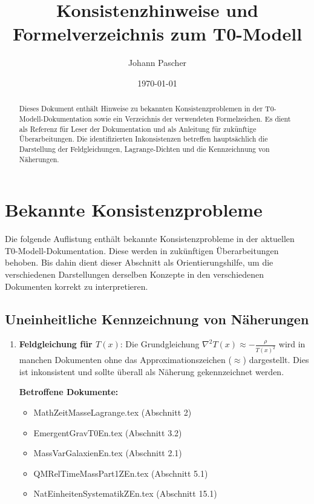 \documentclass[12pt,a4paper]{article}
\title{Konsistenzhinweise und Formelverzeichnis zum T0-Modell}
\author{Johann Pascher}
\date{\today}
\newcommand{\Tfield}{T(x)}
\begin{document}
	
	\maketitle
	
	\begin{abstract}
		Dieses Dokument enthält Hinweise zu bekannten Konsistenzproblemen in der T0-Modell-Dokumentation sowie ein Verzeichnis der verwendeten Formelzeichen. Es dient als Referenz für Leser der Dokumentation und als Anleitung für zukünftige Überarbeitungen. Die identifizierten Inkonsistenzen betreffen hauptsächlich die Darstellung der Feldgleichungen, Lagrange-Dichten und die Kennzeichnung von Näherungen.
	\end{abstract}
	
	\tableofcontents
	\newpage
	
	\section{Bekannte Konsistenzprobleme}
	
	\begin{tcolorbox}[colback=yellow!5!white,colframe=yellow!75!black,title=Hinweis für Leser]
		Die folgende Auflistung enthält bekannte Konsistenzprobleme in der aktuellen T0-Modell-Dokumentation. Diese werden in zukünftigen Überarbeitungen behoben. Bis dahin dient dieser Abschnitt als Orientierungshilfe, um die verschiedenen Darstellungen derselben Konzepte in den verschiedenen Dokumenten korrekt zu interpretieren.
	\end{tcolorbox}
	
	\subsection{Uneinheitliche Kennzeichnung von Näherungen}
	
	\begin{enumerate}[label=\textbf{P\arabic*.}]
		\item \textbf{Feldgleichung für $\Tfield$}: Die Grundgleichung $\nabla^2\Tfield \approx -\frac{\rho}{\Tfield^2}$ wird in manchen Dokumenten ohne das Approximationszeichen ($\approx$) dargestellt. Dies ist inkonsistent und sollte überall als Näherung gekennzeichnet werden.
		
		\textbf{Betroffene Dokumente:}
		\begin{itemize}
			\item MathZeitMasseLagrange.tex (Abschnitt 2)
			\item EmergentGravT0En.tex (Abschnitt 3.2)
			\item MassVarGalaxienEn.tex (Abschnitt 2.1)
			\item QMRelTimeMassPart1ZEn.tex (Abschnitt 5.1)
			\item NatEinheitenSystematikZEn.tex (Abschnitt 15.1)
		\end{itemize}
	\end{enumerate}
	
\end{document}
